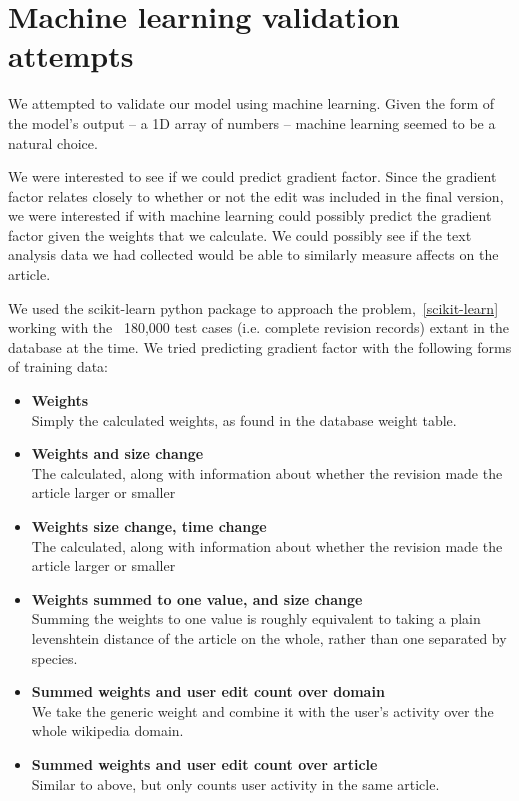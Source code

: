 \section{Machine learning validation attempts}
\label{mlisbad}
We attempted to validate our model using machine learning. Given the
form of the model's output -- a 1D array of numbers -- machine
learning seemed to be a natural choice.

We were interested to see if we could predict gradient factor. Since
the gradient factor relates closely to whether or not the edit was
included in the final version, we were interested if with machine
learning could possibly predict the gradient factor given the weights
that we calculate. We could possibly see if the text analysis data we
had collected would be able to similarly measure affects on the
article.

We used the scikit-learn python package to approach the
problem,~\ref{scikit-learn} working with the ~180,000 test cases (i.e.
complete revision records) extant in the database at the time. We
tried predicting gradient factor with the following forms of training
data:

\begin{itemize}
  \item \textbf{Weights}\\
    Simply the calculated weights, as found in the database weight table. 

  \item \textbf{Weights and size change}\\
    The calculated, along with information about whether the revision
    made the article larger or smaller

  \item \textbf{Weights size change, time change}\\
    The calculated, along with information about whether the revision
    made the article larger or smaller

  \item \textbf{Weights summed to one value, and size change}\\
    Summing the weights to one value is roughly equivalent to taking a
    plain levenshtein distance of the article on the whole, rather
    than one separated by species.
    
  \item \textbf{Summed weights and user edit count over
    domain}\\ We take the generic weight and combine it with the
    user's activity over the whole wikipedia domain.
    

  \item \textbf{Summed weights and user edit count over
    article}\\ Similar to above, but only counts user activity in the
    same article.

\end{itemize}

